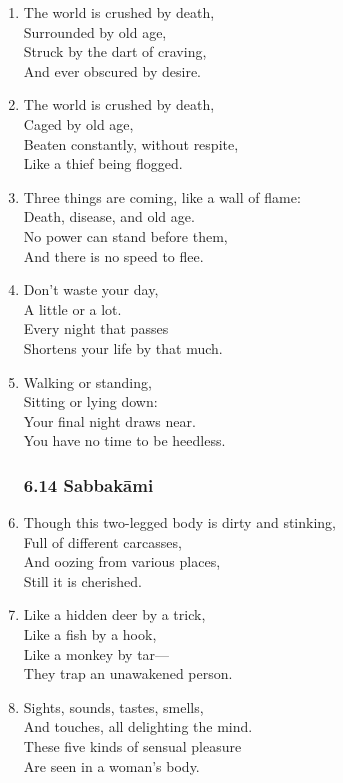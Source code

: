 \documentclass[10pt, openany]{book}
\begin{document}
\begin{enumerate}
\item The world is crushed by death,\\
Surrounded by old age,\\
Struck by the dart of craving,\\
And ever obscured by desire.

\item The world is crushed by death,\\
Caged by old age,\\
Beaten constantly, without respite,\\
Like a thief being flogged.

\item Three things are coming, like a wall of flame:\\
Death, disease, and old age.\\
No power can stand before them,\\
And there is no speed to flee.

\item Don’t waste your day,\\
A little or a lot.\\
Every night that passes\\
Shortens your life by that much.

\item Walking or standing,\\
Sitting or lying down:\\
Your final night draws near.\\
You have no time to be heedless.

\subsubsection*{6.14 Sabbakāmi}

\item Though this two-legged body is dirty and stinking,\\
Full of different carcasses,\\
And oozing from various places,\\
Still it is cherished.

\item Like a hidden deer by a trick,\\
Like a fish by a hook,\\
Like a monkey by tar—\\
They trap an unawakened person.

\item Sights, sounds, tastes, smells,\\
And touches, all delighting the mind.\\
These five kinds of sensual pleasure\\
Are seen in a woman’s body.


\end{enumerate}
\end{document}
